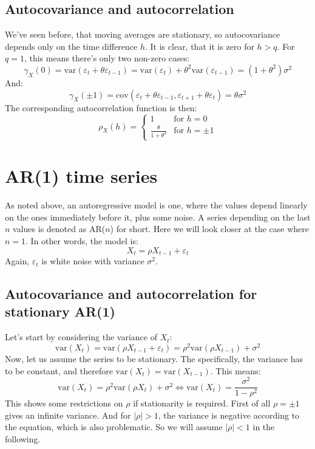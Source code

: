 \documentclass[12pt, a4paper]{article}
\numberwithin{equation}{section}
\begin{document}
\subsection{Autocovariance and autocorrelation}
We've seen before, that moving averages are stationary, so autocovariance depends only on the time difference $h$. It is clear, that it is zero for $h>q$. For $q=1$, this means there's only two non-zero cases:
\begin{equation}
\gamma_X(0)=\textrm{var}(\varepsilon_t+\theta\varepsilon_{t-1})=\textrm{var}(\varepsilon_t)+\theta^2\textrm{var}(\varepsilon_{t-1})=(1+\theta^2)\sigma^2
\end{equation}
And:
\begin{equation}
\gamma_X(\pm 1)=\textrm{cov}(\varepsilon_t+\theta\varepsilon_{t-1},\varepsilon_{t+1}+\theta\varepsilon_t)=\theta\sigma^2
\end{equation}
The corresponding autocorrelation function is then:
\begin{equation}
\rho_X(h)=
\begin{cases}
1 & \textrm{for }h=0 \\
\frac{\theta}{1+\theta^2} & \textrm{for }h=\pm 1
\end{cases}
\end{equation}


\section{AR(1) time series}
As noted above, an autoregressive model is one, where the values depend linearly on the ones immediately before it, plus some noise. A series depending on the last $n$ values is denoted as AR($n$) for short. Here we will look closer at the case where $n=1$. In other words, the model is:
\begin{equation}
X_t=\rho X_{t-1}+\varepsilon_t
\end{equation}
Again, $\varepsilon_t$ is white noise with variance $\sigma^2$.

\subsection{Autocovariance and autocorrelation for stationary AR(1)}
Let's start by considering the variance of $X_t$:
\begin{equation}
\textrm{var}(X_t)=\textrm{var}(\rho X_{t-1}+\varepsilon_t)=\rho^2\textrm{var}(\rho X_{t-1})+\sigma^2
\end{equation}
Now, let us assume the series to be stationary. The specifically, the variance has to be constant, and therefore $\textrm{var}(X_t)=\textrm{var}(X_{t-1})$. This means:
\begin{equation}
\label{AR1_variance}
\textrm{var}(X_t)=\rho^2\textrm{var}(\rho X_t)+\sigma^2\Leftrightarrow\textrm{var}(X_t)=\frac{\sigma^2}{1-\rho^2}
\end{equation}
This shows some restrictions on $\rho$ if stationarity is required. First of all $\rho=\pm 1$ gives an infinite variance. And for $|\rho|>1$, the variance is negative according to the equation, which is also problematic. So we will assume $|\rho|<1$ in the following.
\end{document}
